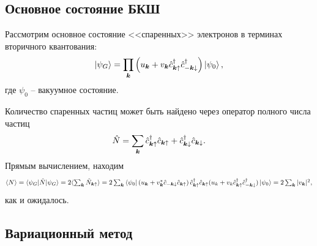 \subsection*{Основное состояние БКШ}


Рассмотрим основное состояние <<спаренных>> электронов в терминах вторичного квантования:
\begin{equation}
	\left| \psi_G \right\rangle = \prod_{{\boldsymbol{k}}} \left(
		u_{{\boldsymbol{k}}} + v_{{\boldsymbol{k}}} \hat{c}^{\dag}_{{\boldsymbol{k}} \uparrow} \hat{c}^{\dag}_{-{\boldsymbol{k}}\downarrow}
	\right) \left| \psi_0 \right\rangle,
	\label{GroundBCS}
\end{equation}
где $\psi_0$ -- вакуумное состояние. 

Количество спаренных частиц может быть найдено через оператор полного числа частиц
\begin{equation*}
	\hat{N} = \sum_{{\boldsymbol{k}}}  \hat{c}^{\dag}_{{\boldsymbol{k}} \uparrow} \hat{c}_{{\boldsymbol{k}} \uparrow} + \hat{c}^{\dag}_{{\boldsymbol{k}} \downarrow} \hat{c}_{{\boldsymbol{k}} \downarrow}.
\end{equation*}
Прямым вычислением, находим
\begin{equation*}
	\langle N\rangle = \bk{\psi_G}[\hat{N}]{\psi_G} = 2 \langle \textstyle\sum_{\vc{k}} \hat{N}_{\vc{k} \up} \rangle 
	= 2 \sum_{\vc{k}} \bra{\psi_0}
	 \left(
		u_\vc{k} + v_{\vc{k}}^* \hat{c}_{-\vc{k}\down} \hat{c}_{\vc{k} \up}
	\right)
	\hat{c}_{\vc{k} \up}\D \hat{c}_{\vc{k} \up} 
	(
		u_k + v_k \hat{c}\D_{\vc{k} \up} \hat{c}_{-\vc{k}\down}\D
	) \ket{\psi_0} = 2 \sum_{\vc{k}} |v_{\vc{k}}|^2,
\end{equation*}
как и ожидалось. 





\subsection*{Вариационный метод}


